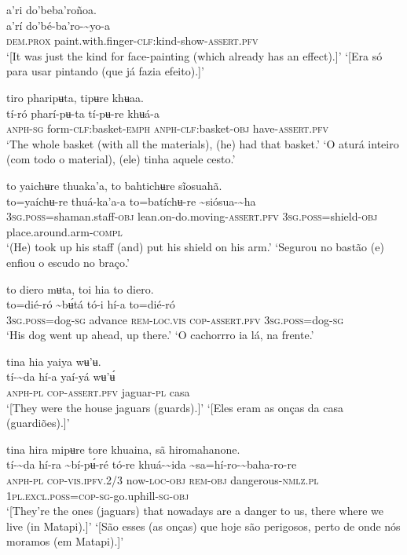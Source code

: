 \documentclass[output=paper,
modfonts,nonflat
]{langsci/langscibook}
\begin{document}
 
\ea a’ri do'beba'roñoa. \\[.3em]
\gll a’rí	do'bé-ba'ro-{\textasciitilde}yo-a \\
     \textsc{dem.prox}	paint.with.finger-\textsc{clf:}kind-show-\textsc{assert.pfv}\\
\glt ‘[It was just the kind for face-painting (which already has an effect).]’
\glt ‘[Era só para usar pintando (que já fazia efeito).]’
\z 

\ea tiro pharipʉta, tipʉre khʉaa. \\[.3em]
\gll tí-ró	pharí-pʉ-ta	tí-pʉ-re	khʉá-a \\
     \textsc{anph-sg}	form-\textsc{clf:}basket-\textsc{emph}	\textsc{anph}-\textsc{clf:}basket\textsc{-obj}	have-\textsc{assert.pfv}\\
\glt ‘The whole basket (with all the materials), (he) had that basket.’
\glt ‘O aturá inteiro (com todo o material), (ele) tinha aquele cesto.’
\z 

\ea to yaichʉre thuaka'a, to bahtichʉre sĩosuahã. \\[.3em]
\gll to=yaíchʉ-re	thuá-ka'a-a	to=batíchʉ-re	{\textasciitilde}siósua-{\textasciitilde}ha \\
     3\textsc{sg.poss}=shaman.staff\textsc{-obj}	lean.on-do.moving-\textsc{assert.pfv}	3\textsc{sg.poss}=shield\textsc{-obj}	place.around.arm-\textsc{compl}\\
\glt ‘(He) took up his staff (and) put his shield on his arm.’
\glt ‘Segurou no bastão (e) enfiou o escudo no braço.’
\z 

\ea to diero mʉta, toi hia to diero.  \\[.3em]
\gll to=dié-ró	{\textasciitilde}bʉ́tá	tó-i	hí-a	to=dié-ró\\
     3\textsc{sg.poss}=dog\textsc{-sg}	advance	\textsc{rem-loc.vis}	\textsc{cop-assert.pfv}	3\textsc{sg.poss}=dog\textsc{-sg}\\
\glt ‘His dog went up ahead, up there.’
\glt ‘O cachorrro ia lá, na frente.’
\z 

\ea tina hia yaiya wʉ'ʉ.  \\[.3em]
\gll tí-{\textasciitilde}da	hí-a	yaí-yá	wʉ'ʉ́ \\
     \textsc{anph-pl}	\textsc{cop-assert.pfv}	jaguar\textsc{-pl}	casa\\
\glt ‘[They were the house jaguars (guards).]’
\glt ‘[Eles eram as onças da casa (guardiões).]’
\z 

\ea tina hira mipʉre tore khuaina, sã hiromahanone. \\[.3em]
\gll tí-{\textasciitilde}da	hí-ra	{\textasciitilde}bí-pʉ́-ré	tó-re	khuá-{\textasciitilde}ida	{\textasciitilde}sa=hí-ro-{\textasciitilde}baha-ro-re \\
     \textsc{anph-pl}	\textsc{cop-vis.ipfv.}2/3	now\textsc{-loc}\textsc{-obj}	\textsc{rem-obj}	dangerous\textsc{-nmlz.pl}	1\textsc{pl.excl.poss=cop-sg}-go.uphill\textsc{-sg-obj}\\
\glt ‘[They're the ones (jaguars) that nowadays are a danger to us, there where we live (in Matapi).]’
\glt ‘[São esses (as onças) que hoje são perigosos, perto de onde nós moramos (em Matapi).]’
\z 
\end{document}
